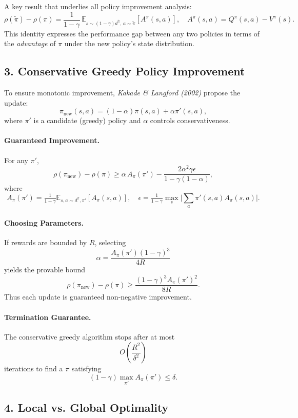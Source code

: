 \documentclass[12pt]{article}
\begin{document}
A key result that underlies all policy improvement analysis:
\[
		\rho(\tilde\pi)-\rho(\pi)
		= \frac{1}{1-\gamma}\,
		\mathbb{E}_{s\sim(1-\gamma)d^{\tilde\pi},\,a\sim\tilde\pi}
		[A^\pi(s,a)],
		\quad A^\pi(s,a)=Q^\pi(s,a)-V^\pi(s).
\]
This identity expresses the performance gap between any two policies in terms of the
\emph{advantage} of $\pi$ under the new policy’s state distribution.

\subsection*{3. Conservative Greedy Policy Improvement}

To ensure monotonic improvement, \textit{Kakade \& Langford (2002)} propose the update:
\[
		\pi_{\text{new}}(s,a) = (1-\alpha)\pi(s,a) + \alpha\pi'(s,a),
\]
where $\pi'$ is a candidate (greedy) policy and $\alpha$ controls conservativeness.

\paragraph{Guaranteed Improvement.}
For any $\pi'$,
\[
		\rho(\pi_{\text{new}}) - \rho(\pi)
		\ge \alpha\,A_\pi(\pi') - \frac{2\alpha^2\gamma\epsilon}{1-\gamma(1-\alpha)},
\]
where
\[
		A_\pi(\pi') = \tfrac{1}{1-\gamma}\mathbb{E}_{s,a\sim d^\pi,\pi'}[A_\pi(s,a)],\quad
		\epsilon = \tfrac{1}{1-\gamma}\max_s\big|\!\sum_a \pi'(s,a)A_\pi(s,a)\big|.
\]

\paragraph{Choosing Parameters.}
If rewards are bounded by $R$, selecting
\[
		\alpha = \frac{A_\pi(\pi')(1-\gamma)^3}{4R}
\]
yields the provable bound
\[
		\rho(\pi_{\text{new}}) - \rho(\pi)
		\ge \frac{(1-\gamma)^3A_\pi(\pi')^2}{8R}.
\]
Thus each update is guaranteed non-negative improvement.

\paragraph{Termination Guarantee.}
The conservative greedy algorithm stops after at most
\[
		O\!\left(\frac{R^2}{\delta^2}\right)
\]
iterations to find a $\pi$ satisfying
\[
		(1-\gamma)\max_{\pi'}A_\pi(\pi')\le \delta.
\]

\subsection*{4. Local vs. Global Optimality}
\end{document}
